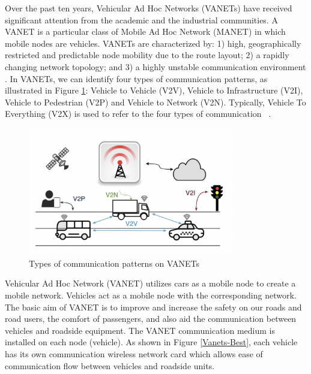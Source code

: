 \documentclass[
  oneside,
  11pt, a4paper,
  footinclude=true,
  headinclude=true,
  cleardoublepage=empty
]{scrbook}
\begin{document}
Over the past ten years, Vehicular Ad Hoc Networks (VANETs) have received significant attention from the academic and the industrial communities. A VANET is a particular class of Mobile Ad Hoc Network (MANET) in which mobile nodes are vehicles. VANETs are characterized by: 1) high, geographically restricted and predictable node mobility due to the route layout; 2) a rapidly changing network topology; and 3) a highly unstable communication environment . In VANETs, we can identify four types of communication patterns, as illustrated in Figure \ref{Types-of-communication patterns-on-VANETs}: Vehicle to Vehicle (V2V), Vehicle to Infrastructure (V2I), Vehicle to Pedestrian (V2P) and Vehicle to Network (V2N). Typically, Vehicle To Everything (V2X) is used to refer to the four types of communication ~\cite{vanets}.

\begin{figure}[H]
\begin{center}
  \includegraphics[width=0.8\textwidth]{img/types vanets.png}
\end{center}
  \caption{Types of communication patterns on VANETs ~\cite{vanets}}
  \centering  
\label{Types-of-communication patterns-on-VANETs}
\end{figure}

Vehicular Ad Hoc Network (VANET) utilizes cars as a mobile node to create a mobile network. Vehicles act as a mobile node with the corresponding network. The basic aim of VANET is to improve and increase the safety on our roads and road users, the comfort of passengers, and also aid the communication between vehicles and roadside equipment. The VANET communication medium is installed on each node (vehicle). As shown in Figure \ref{Vanets-Best}, each vehicle has its own communication wireless network card which allows ease of communication flow between vehicles and roadside units. \par
\end{document}
